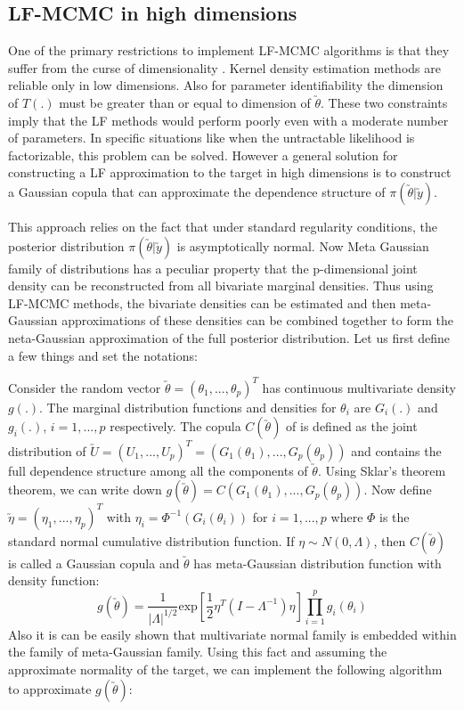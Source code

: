 \begin{multicols}{2}
\section{LF-MCMC in high dimensions}
One of the primary restrictions to implement LF-MCMC algorithms is that they suffer from the curse of dimensionality \cite{blum2010non}. Kernel density estimation methods are reliable only in low dimensions. Also for parameter identifiability the dimension of $T(.)$ must be greater than or equal to dimension of $\utilde{\theta}$. These two constraints imply that the LF methods would perform poorly even with a moderate number of parameters. In specific situations like when the untractable likelihood is factorizable, this problem can be solved. However a general solution for constructing a LF approximation to the target in high dimensions is to construct a Gaussian copula that can approximate the dependence structure of $\pi(\utilde{\theta}|\utilde{y})$\cite{li2015extending}.

This approach relies on the fact that under standard regularity conditions, the posterior distribution  $\pi(\utilde{\theta}|\utilde{y})$ is asymptotically normal\cite{van2000asymptotic}. Now Meta Gaussian family of distributions has a peculiar property that the p-dimensional joint density can be reconstructed from all bivariate marginal densities. Thus using LF-MCMC methods, the bivariate densities can be estimated and then meta-Gaussian approximations of these densities can be combined together to form the neta-Gaussian approximation of the full posterior distribution. Let us first define a few things and set the notations:

Consider the random vector $\utilde{\theta}=(\theta_1,..., \theta_p)^T$ has continuous multivariate density $g(.)$. The marginal distribution functions and densities for $\theta_i$ are $G_i(.)$ and $g_i(.)$, $i=1,..., p$ respectively. The copula $C(\utilde{\theta})$ of is defined as the joint distribution of $\utilde{U}=(U_1,..., U_p)^T=(G_1(\theta_1),..., G_p(\theta_p))$ and contains the full dependence structure among all the components of $\utilde{\theta}$. Using Sklar's theorem theorem\cite{sklar1959fonctions}, we can write down $g(\utilde{\theta})=C(G_1(\theta_1),..., G_p(\theta_p))$. Now define $\utilde{\eta}=(\eta_1,..., \eta_p)^T$ with $\eta_i=\Phi^{-1}(G_i(\theta_i))$ for $i=1,..., p$ where $\Phi$ is the standard normal cumulative distribution function. If 
$\eta\sim N(0,\Lambda)$, then $C(\utilde{\theta})$ is called a Gaussian copula and $\utilde{\theta}$ has meta-Gaussian distribution function with density function:
\begin{equation}
\label{eq10}
g(\utilde{\theta})=\dfrac{1}{|\Lambda|^{1/2}}\text{exp}\left[\dfrac{1}{2}\eta^{T}(I-\Lambda^{-1})\eta\right]\prod\limits_{i=1}^{p}g_i(\theta_i)
\end{equation}
Also it is can be easily shown that multivariate normal family is embedded within the family of meta-Gaussian family\cite{li2015extending}. Using this fact and assuming the approximate normality of the target, we can implement the following algorithm to approximate $g(\utilde{\theta})$:


\end{multicols}
